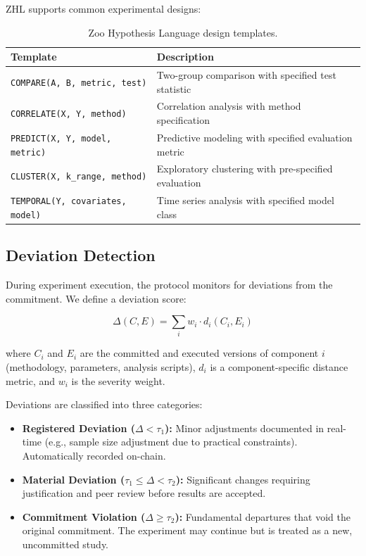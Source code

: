 \documentclass[11pt,a4paper]{article}
\begin{document}
ZHL supports common experimental designs:

\begin{table}[H]
\centering
\caption{Zoo Hypothesis Language design templates.}
\label{tab:zhl_templates}
\begin{tabularx}{\textwidth}{@{}lX@{}}
\toprule
\textbf{Template} & \textbf{Description} \\
\midrule
\texttt{COMPARE(A, B, metric, test)} & Two-group comparison with specified test statistic \\
\texttt{CORRELATE(X, Y, method)} & Correlation analysis with method specification \\
\texttt{PREDICT(X, Y, model, metric)} & Predictive modeling with specified evaluation metric \\
\texttt{CLUSTER(X, k\_range, method)} & Exploratory clustering with pre-specified evaluation \\
\texttt{TEMPORAL(Y, covariates, model)} & Time series analysis with specified model class \\
\bottomrule
\end{tabularx}
\end{table}

\subsection{Deviation Detection}

During experiment execution, the protocol monitors for deviations from the commitment.
We define a deviation score:

\begin{equation}
    \Delta(C, E) = \sum_{i} w_i \cdot d_i(C_i, E_i)
\end{equation}

\noindent where $C_i$ and $E_i$ are the committed and executed versions of component $i$ (methodology, parameters, analysis scripts), $d_i$ is a component-specific distance metric, and $w_i$ is the severity weight.

Deviations are classified into three categories:
\begin{itemize}[leftmargin=*]
    \item \textbf{Registered Deviation ($\Delta < \tau_1$):} Minor adjustments documented in real-time (e.g., sample size adjustment due to practical constraints). Automatically recorded on-chain.
    \item \textbf{Material Deviation ($\tau_1 \leq \Delta < \tau_2$):} Significant changes requiring justification and peer review before results are accepted.
    \item \textbf{Commitment Violation ($\Delta \geq \tau_2$):} Fundamental departures that void the original commitment. The experiment may continue but is treated as a new, uncommitted study.
\end{itemize}
\end{document}
